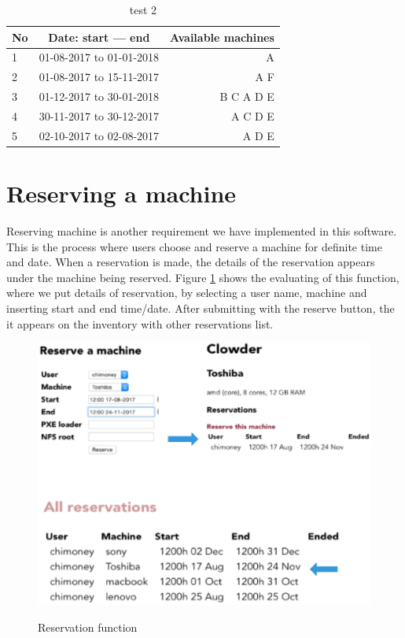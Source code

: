 \begin{table}[h!]
  \centering
  \label{tab:table1}
  \begin{tabular}{l|c||r}
    No & Date: start --- end & Available machines\\
    \hline
    1 &01-08-2017 to 01-01-2018  & A \\
    2 &01-08-2017 to 15-11-2017  & A F\\
    3 &01-12-2017 to 30-01-2018  & B C A D E \\
    4 &30-11-2017 to 30-12-2017  & A  C D E\\
    5 &02-10-2017 to 02-08-2017  & A  D E \\
   
  \end{tabular}
  \caption{test 2}
\end{table}

\section*{Reserving a machine}
Reserving machine is another requirement we have implemented in this software. This is the process where users choose and reserve a machine for definite time and date. When a reservation is made, the details of the reservation appears under the machine being reserved. Figure \ref{fig:reserve} shows the evaluating of this function, where we put details of reservation, by selecting a user name, machine and inserting start and end time/date. After submitting with the reserve button, the it appears on the inventory with other reservations list. 
\begin{figure}[h]
  \includegraphics[width=\linewidth]{reserve.eps}
  \label{fig:reserve}
  \caption{Reservation function}
\end{figure}
\pagebreak
